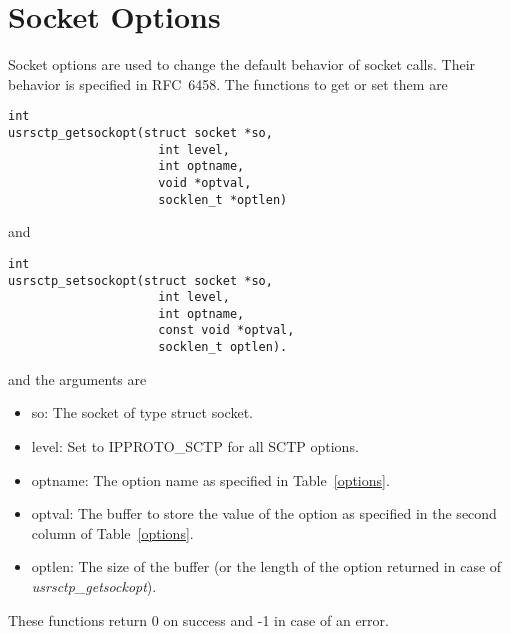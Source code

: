 \documentclass[a4paper]{article}
\begin{document}
\section{Socket Options}
Socket options are used to change the default behavior of socket calls.
Their behavior is specified in RFC~6458. The functions to get or set them are

\begin{verbatim}
int
usrsctp_getsockopt(struct socket *so,
                     int level,
                     int optname,
                     void *optval,
                     socklen_t *optlen)
\end{verbatim}
and
\begin{verbatim}
int
usrsctp_setsockopt(struct socket *so,
                     int level,
                     int optname,
                     const void *optval,
                     socklen_t optlen).
\end{verbatim}

and the arguments are
\begin{itemize}
\item so:  The socket of type struct socket.
\item level:  Set to IPPROTO\_SCTP for all SCTP options.
\item optname:  The option name as specified in Table~\ref{options}.
\item optval: The buffer to store the value of the option as specified in the second column of Table~\ref{options}.
\item optlen:  The size of the buffer (or the length of the option
      returned in case of \textit{usrsctp\_getsockopt}).
\end{itemize}

These functions return 0 on success and -1 in case of an error.
\end{document}
